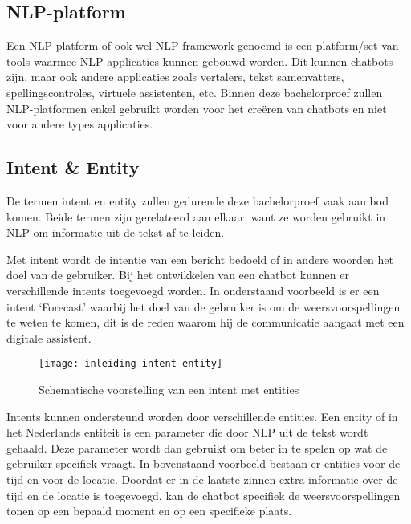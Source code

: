 \subsection{NLP-platform}
\label{subsec:begrippen-nlp-platform}

Een NLP-platform of ook wel NLP-framework genoemd is een platform/set van tools waarmee NLP-applicaties kunnen gebouwd worden. Dit kunnen chatbots zijn, maar ook andere applicaties zoals vertalers, tekst samenvatters, spellingscontroles, virtuele assistenten, etc. Binnen deze bachelorproef zullen NLP-platformen enkel gebruikt worden voor het creëren van chatbots en niet voor andere types applicaties.

\subsection{Intent \& Entity}
\label{subsec:begrippen-intent-entity}

De termen intent en entity zullen gedurende deze bachelorproef vaak aan bod komen. Beide termen zijn gerelateerd aan elkaar, want ze worden gebruikt in NLP om informatie uit de tekst af te leiden.

Met intent wordt de intentie van een bericht bedoeld of in andere woorden het doel van de gebruiker. Bij het ontwikkelen van een chatbot kunnen er verschillende intents toegevoegd worden. In onderstaand voorbeeld is er een intent ‘Forecast’ waarbij het doel van de gebruiker is om de weersvoorspellingen te weten te komen, dit is de reden waarom hij de communicatie aangaat met een digitale assistent.

\begin{figure}[!htbp]
    \label{fig:inleiding-intent-entity}
    \centering
    \texttt{[image: inleiding-intent-entity]}
    \caption{Schematische voorstelling van een intent met entities \autocite{GoogleCloud2020}}
\end{figure}

Intents kunnen ondersteund worden door verschillende entities. Een entity of in het Nederlands entiteit is een parameter die door NLP uit de tekst wordt gehaald. Deze parameter wordt dan gebruikt om beter in te spelen op wat de gebruiker specifiek vraagt. In bovenstaand voorbeeld bestaan er entities voor de tijd en voor de locatie. Doordat er in de laatste zinnen extra informatie over de tijd en de locatie is toegevoegd, kan de chatbot specifiek de weersvoorspellingen tonen op een bepaald moment en op een specifieke plaats.

